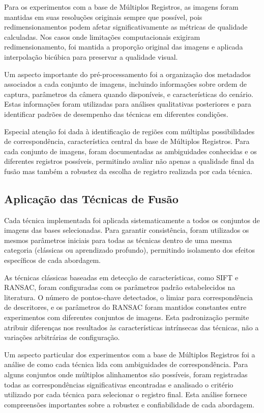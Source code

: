 Para os experimentos com a base de Múltiplos Registros, as imagens foram mantidas em suas resoluções originais sempre que possível, pois redimensionamentos podem afetar significativamente as métricas de qualidade calculadas. Nos casos onde limitações computacionais exigiram redimensionamento, foi mantida a proporção original das imagens e aplicada interpolação bicúbica para preservar a qualidade visual.

Um aspecto importante do pré-processamento foi a organização dos metadados associados a cada conjunto de imagens, incluindo informações sobre ordem de captura, parâmetros da câmera quando disponíveis, e características do cenário. Estas informações foram utilizadas para análises qualitativas posteriores e para identificar padrões de desempenho das técnicas em diferentes condições.

Especial atenção foi dada à identificação de regiões com múltiplas possibilidades de correspondência, característica central da base de Múltiplos Registros. Para cada conjunto de imagens, foram documentadas as ambiguidades conhecidas e os diferentes registros possíveis, permitindo avaliar não apenas a qualidade final da fusão mas também a robustez da escolha de registro realizada por cada técnica.

\subsection{Aplicação das Técnicas de Fusão}

Cada técnica implementada foi aplicada sistematicamente a todos os conjuntos de imagens das bases selecionadas. Para garantir consistência, foram utilizados os mesmos parâmetros iniciais para todas as técnicas dentro de uma mesma categoria (clássicas ou aprendizado profundo), permitindo isolamento dos efeitos específicos de cada abordagem.

As técnicas clássicas baseadas em detecção de características, como SIFT e RANSAC, foram configuradas com os parâmetros padrão estabelecidos na literatura. O número de pontos-chave detectados, o limiar para correspondência de descritores, e os parâmetros do RANSAC foram mantidos constantes entre experimentos com diferentes conjuntos de imagens. Esta padronização permite atribuir diferenças nos resultados às características intrínsecas das técnicas, não a variações arbitrárias de configuração.

Um aspecto particular dos experimentos com a base de Múltiplos Registros foi a análise de como cada técnica lida com ambiguidades de correspondência. Para alguns conjuntos onde múltiplos alinhamentos são possíveis, foram registradas todas as correspondências significativas encontradas e analisado o critério utilizado por cada técnica para selecionar o registro final. Esta análise fornece compreensões importantes sobre a robustez e confiabilidade de cada abordagem.

